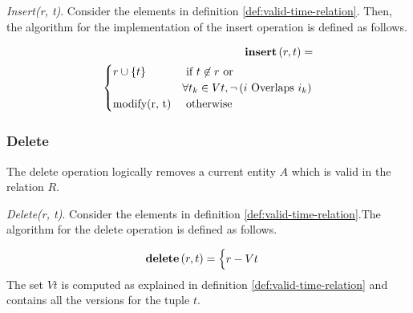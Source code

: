 \begin{definition}
 \emph{Insert(r, t)}.
Consider the elements in definition \ref{def:valid-time-relation}. Then, the algorithm for the implementation of the insert operation is defined as follows.
\end{definition}



\begin{align}
\label{eq:insert}
\INS \left(r, t\right) =\\
\begin{cases}
\nonumber
r \cup \lbrace t \rbrace
& \mbox{ if }  t \not \in r \mbox{ or }\\
\nonumber & \forall t_k \in Vt, \lnot \left(i \mbox{ Overlaps } i_k\right)\\
% 
\mbox{modify(r, t)} & \mbox{ otherwise }    %
\end{cases} 	
\end{align}

\subsubsection{\label{subsubsec:del}Delete}
The delete operation logically removes a current entity $A$ which is valid in the relation $R$.
\begin{definition}
 \emph{Delete(r, t)}.
Consider the elements in definition \ref{def:valid-time-relation}.The algorithm for the delete operation is defined as follows.
% 
\end{definition}


\begin{align}
\label{eq:delete}
\DEL \left(r, t\right) =
\begin{cases}
\nonumber
r - Vt
% 
% 
\end{cases} 	
\end{align}
The set $Vt$ is computed as explained in definition \ref{def:valid-time-relation} and contains all the versions for the tuple $t$.


